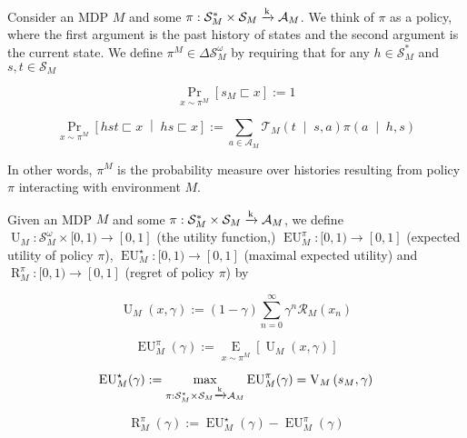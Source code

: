 \documentclass[anon,12pt]{colt2018} %
\newcommand{\AP}[1]{\left(#1\right)}
\newcommand{\AB}[1]{\left[#1\right]}
\newcommand{\APM}[2]{\left(#1\;\middle\vert\;#2\right)}
\newcommand{\ABM}[2]{\left[#1\;\middle\vert\;#2\right]}
\newcommand{\Pa}[2]{\underset{#1}{\operatorname{Pr}}\AB{#2}}
\newcommand{\CP}[3]{\underset{#1}{\operatorname{Pr}}\ABM{#2}{#3}}
\newcommand{\Ea}[2]{\underset{#1}{\operatorname{E}}\AB{#2}}
\newcommand{\K}{\xrightarrow{\textnormal{k}}}
\newcommand{\A}{\mathcal{A}}
\newcommand{\St}{\mathcal{S}}
\newcommand{\T}{\mathcal{T}}
\newcommand{\R}{\mathcal{R}}
\newcommand{\Ut}{\operatorname{U}}
\newcommand{\V}{\operatorname{V}}
\newcommand{\EU}{\operatorname{EU}}
\newcommand{\Rg}{\operatorname{R}}
\begin{document}
\begin{samepage}
\begin{definition}

Consider an MDP $M$ and some $\pi: \St_M^* \times \St_M \K \A_M$. We think of $\pi$ as a policy, where the first argument is the past history of states and the second argument is the current state. We define $\pi^M \in \Delta\St_M^\omega$ by requiring that for any $h \in \St_M^*$ and $s,t \in \St_M$

\begin{equation}
\Pa{x\sim\pi^M }{s_M \sqsubset x} := 1
\end{equation}


\begin{equation}
\CP{x\sim\pi^M }{hst \sqsubset x}{hs \sqsubset x} := \sum_{a \in \A_M} {\T_M\APM{t}{s,a} \pi\APM{a}{h,s}}
\end{equation}

In other words, $\pi^M$ is the probability measure over histories resulting from policy $\pi$ interacting with environment $M$.

\end{definition}
\end{samepage}

\begin{samepage}
\begin{definition}
\label{def:utility}

Given an MDP $M$ and some $\pi: \St_M^* \times \St_M \K \A_M$, we define $\Ut_M: \St_M^\omega \times [0,1) \rightarrow [0,1]$ (the utility function,) $\EU_M^\pi: [0,1) \rightarrow [0,1]$ (expected utility of policy $\pi$), $\EU_M^\star: [0,1) \rightarrow [0,1]$ (maximal expected utility) and $\Rg_M^\pi:[0,1)\rightarrow[0,1]$ (regret of policy $\pi$) by

\begin{equation}
\Ut_M(x,\gamma) := (1-\gamma)\sum_{n=0}^\infty {\gamma^n \R_M\AP{x_n}}
\end{equation}

\begin{equation}
\EU_M^\pi(\gamma) := \Ea{x\sim\pi^M}{\Ut_M(x,\gamma)}
\end{equation}

\begin{equation}
\EU_M^\star(\gamma):=\max_{\pi: \St_M^* \times \St_M \K \A_M} {\EU_M^\pi(\gamma)} = \V_M\AP{s_M,\gamma}
\end{equation}

\begin{equation}
\Rg_M^\pi(\gamma):=\EU_M^\star(\gamma)-\EU_M^\pi(\gamma)
\end{equation}

\end{definition}
\end{samepage}
\end{document}
